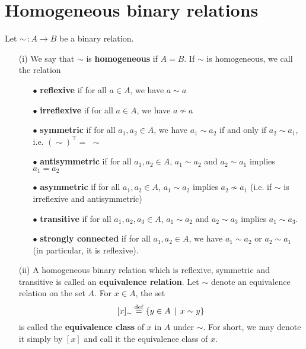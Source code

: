 \section{Homogeneous binary relations}

\begin{definition}
	Let $\sim \, : A \to B$ be a binary relation. 
    \begin{itemize}
        \item[(i)] We say that $\sim$ is \textbf{homogeneous} if $A = B$. If $\sim$ is homogeneous, we call the relation
            \begin{itemize}
                \item[$\bullet$] \textbf{reflexive} if for all $a \in A$, we have $a \sim a$
                \item[$\bullet$] \textbf{irreflexive} if for all $a \in A$, we have $a \not\sim a$
                \item[$\bullet$] \textbf{symmetric} if for all $a_1,a_2 \in A$, we have $a_1 \sim a_2$ if and only if $a_2 \sim a_1$, i.e. $(\sim)^{\top} = \,\, \sim$
                \item[$\bullet$] \textbf{antisymmetric} if for all $a_1,a_2 \in A$, $a_1 \sim a_2$ and $a_2 \sim a_1$ implies $a_1 = a_2$
                \item[$\bullet$] \textbf{asymmetric} if for all $a_1,a_2 \in A$, $a_1 \sim a_2$ implies $a_2 \not\sim a_1$ (i.e. if $\sim$ is irreflexive and antisymmetric)
                \item[$\bullet$] \textbf{transitive} if for all $a_1,a_2,a_3 \in A$, $a_1 \sim a_2$ and $a_2 \sim a_3$ implies $a_1 \sim a_3$.
                \\
                \item[$\bullet$] \textbf{strongly connected} if for all $a_1,a_2 \in A$, we have $a_1 \sim a_2$ or $a_2 \sim a_1$ (in particular, it is reflexive).
                \\
            \end{itemize}

        \item[(ii)] A homogeneous binary relation which is reflexive, symmetric and transitive is called an \textbf{equivalence relation}. Let $\sim$ denote an equivalence relation on the set $A$. For $x \in A$, the set
        \[
                [x]_{\sim} \overset{\mathrm{def}}{=} \{ y \in A \, \mid \, x \sim y \}
        \]
        is called the \textbf{equivalence class} of $x$ in $A$ under $\sim$. For short, we may denote it simply by $[x]$ and call it the equivalence class of $x$.
        \\
        

\end{itemize}
\end{definition}
